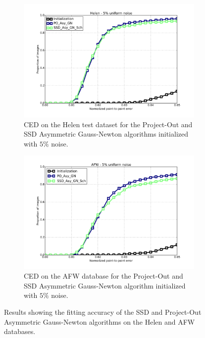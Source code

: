 \begin{figure}[h!]
	\centering
	\begin{subfigure}{0.48\textwidth}
	    \includegraphics[width=\textwidth]{experiments/best/ced_helen_5.png}
	    \caption{CED on the Helen test dataset for the Project-Out and SSD Asymmetric Gauss-Newton algorithms initialized with $5\%$ noise.}
	    \label{fig:ced_po_for_gn}
	\end{subfigure}
	\hfill
	\begin{subfigure}{0.48\textwidth}
	    \includegraphics[width=\textwidth]{experiments/best/ced_afw_5.png}
	    \caption{CED on the AFW database for the Project-Out and SSD Asymmetric Gauss-Newton algorithm initialized with $5\%$ noise.}
	    \label{fig:ced_po_inv_gn}
	\end{subfigure}
	\caption{Results showing the fitting accuracy of the SSD and Project-Out Asymmetric Gauss-Newton algorithms on the Helen and AFW databases.}
	\label{fig:helen_afw}
\end{figure}

